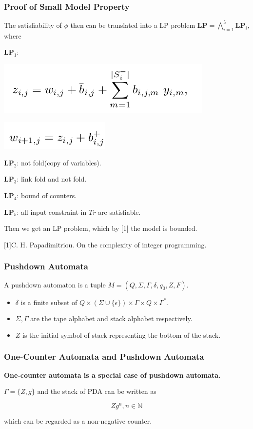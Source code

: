 \documentclass[11pt]{beamer}
\begin{document}
\begin{frame}\frametitle{Proof of Small Model Property}

The satisfiability of $\phi$ then can be translated into a LP problem $\mathbf{LP} = \bigwedge_{i = 1}^{5}\mathbf{LP}_i$, where

$\mathbf{LP}_1$: 
\begin{center}
\includegraphics[scale=0.4]{lp1_1.png}

\includegraphics[scale=0.4]{lp1_2.png}
\end{center}


$\mathbf{LP}_2$: not fold(copy of variables).

$\mathbf{LP}_3$: link fold and not fold. 

$\mathbf{LP}_4$: bound of counters.


$\mathbf{LP}_5$: all input constraint in $Tr$ are satisfiable.

Then we get an LP problem, which by [1] the model is bounded.

[1]C. H. Papadimitriou. On the complexity of integer programming. 

\end{frame}


\iffalse
\begin{frame}\frametitle{Pushdown Automata}
\begin{definition}[PDA]
A pushdown automaton is a tuple $M = (Q, \Sigma, \Gamma, \delta, q_0, Z, F)$.
\begin{itemize}
\item $\delta$ is a finite subset of $Q\times (\Sigma \cup \{\epsilon\}) \times \Gamma \times Q \times \Gamma^*$.
\item $\Sigma, \Gamma$ are the tape alphabet and stack alphabet respectively.
\item $Z$ is the initial symbol of stack representing the bottom of the stack.
\end{itemize}

\end{definition}

\end{frame}
\begin{frame}\frametitle{One-Counter Automata and Pushdown Automata}

\textbf{One-counter automata is a special case of pushdown automata.}

$\Gamma = \{Z, g\}$ and the stack of PDA can be written as 

\[Zg^n, n\in \mathbb{N}\]

which can be regarded as a non-negative counter.



\end{frame}
\end{document}
